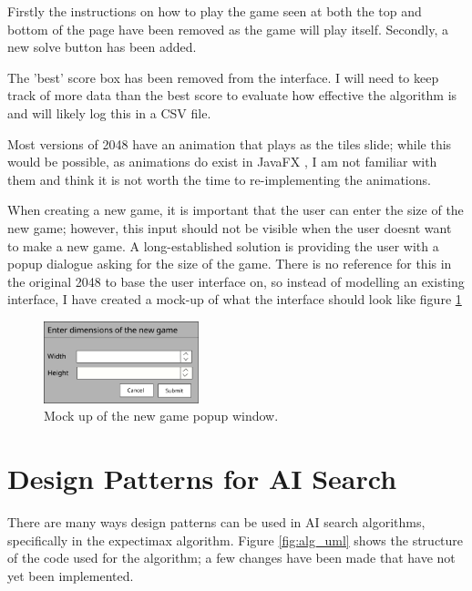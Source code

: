 \documentclass{article}
\begin{document}
Firstly the instructions on how to play the game seen at both the top and bottom of the page have been removed
as the game will play itself. Secondly, a new solve button has been added.

The 'best' score box has been removed from the interface. I will need to keep track of more data than the best score to evaluate how effective the algorithm is and will likely log this in a CSV file.

Most versions of 2048 have an animation that plays as the tiles slide; while this would be possible, as animations do exist in JavaFX \cite{javadocfx}, I am not familiar with them and think it is not worth the time to re-implementing the animations.

When creating a new game, it is important that the user can enter the size of the new game; however, this input should not be visible when the user doesn\textquotesingle t want to make a new game. A long-established solution is providing the user with a popup dialogue asking for the size of the game. There is no reference for this in the original 2048 to base the user interface on, so instead of modelling an existing interface, I have created a mock-up of what the interface should look like figure \ref{fig:popup}

\begin{figure}
    \centering
    \includegraphics[width=0.4\textwidth]{newGamePopup.png}
    \caption{Mock up of the new game popup window.}
    \label{fig:popup}
\end{figure}
\section{Design Patterns for AI Search}
\label{sec:dp}
There are many ways design patterns can be used in AI search algorithms, specifically in the expectimax algorithm. Figure \ref{fig:alg_uml} shows the structure of the code used for the algorithm; a few changes have been made that have not yet been implemented.
\end{document}
